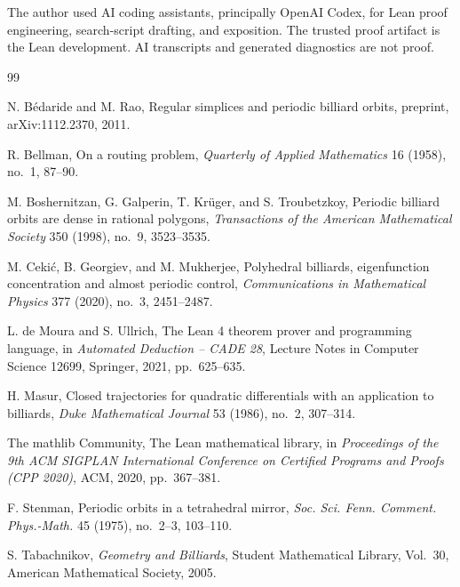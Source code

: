\documentclass[11pt]{article}
\begin{document}
The author used AI coding assistants, principally OpenAI Codex, for Lean
proof engineering, search-script drafting, and exposition.  The trusted proof
artifact is the Lean development.  AI transcripts and generated diagnostics
are not proof.

\begin{thebibliography}{99}

N. B\'edaride and M. Rao,
Regular simplices and periodic billiard orbits,
preprint, arXiv:1112.2370, 2011.

R. Bellman,
On a routing problem,
\emph{Quarterly of Applied Mathematics} 16 (1958), no.~1, 87--90.

M. Boshernitzan, G. Galperin, T. Kr\"uger, and S. Troubetzkoy,
Periodic billiard orbits are dense in rational polygons,
\emph{Transactions of the American Mathematical Society} 350 (1998),
no.~9, 3523--3535.

M. Ceki\'c, B. Georgiev, and M. Mukherjee,
Polyhedral billiards, eigenfunction concentration and almost periodic
control,
\emph{Communications in Mathematical Physics} 377 (2020), no.~3,
2451--2487.

L. de Moura and S. Ullrich,
The Lean 4 theorem prover and programming language,
in \emph{Automated Deduction -- CADE 28},
Lecture Notes in Computer Science 12699, Springer, 2021, pp.~625--635.

H. Masur,
Closed trajectories for quadratic differentials with an application to
billiards,
\emph{Duke Mathematical Journal} 53 (1986), no.~2, 307--314.

The mathlib Community,
The Lean mathematical library,
in \emph{Proceedings of the 9th ACM SIGPLAN International Conference on
Certified Programs and Proofs (CPP 2020)}, ACM, 2020, pp.~367--381.

F. Stenman,
Periodic orbits in a tetrahedral mirror,
\emph{Soc. Sci. Fenn. Comment. Phys.-Math.} 45 (1975), no.~2--3, 103--110.

S. Tabachnikov,
\emph{Geometry and Billiards},
Student Mathematical Library, Vol.~30,
American Mathematical Society, 2005.

\end{thebibliography}
\end{document}
